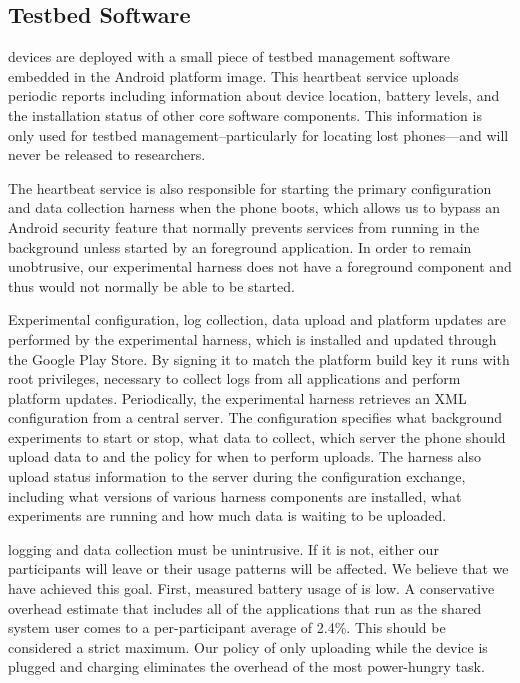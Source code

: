 \subsection{Testbed Software}

\PhoneLab{} devices are deployed with a small piece of testbed management
software embedded in the Android platform image. This heartbeat service
uploads periodic reports including information about device location, battery
levels, and the installation status of other core \PhoneLab{} software
components. This information is only used for testbed
management--particularly for locating lost phones---and will never be
released to researchers.

The heartbeat service is also responsible for starting the primary
\PhoneLab{} configuration and data collection harness when the phone boots,
which allows us to bypass an Android security feature that normally prevents
services from running in the background unless started by an foreground
application. In order to remain unobtrusive, our experimental harness does
not have a foreground component and thus would not normally be able to be
started.

Experimental configuration, log collection, data upload and platform updates
are performed by the \PhoneLab{} experimental harness, which is installed and
updated through the Google Play Store. By signing it to match the platform
build key it runs with root privileges, necessary to collect logs from all
applications and perform platform updates. Periodically, the experimental
harness retrieves an XML configuration from a central \PhoneLab{} server. The
configuration specifies what background experiments to start or stop, what
data to collect, which server the phone should upload data to and the policy
for when to perform uploads. The \PhoneLab{} harness also upload status
information to the server during the configuration exchange, including what
versions of various harness components are installed, what experiments are
running and how much data is waiting to be uploaded.


\PhoneLab{} logging and data collection must be unintrusive. If it is not,
either our participants will leave or their usage patterns will be affected.
We believe that we have achieved this goal. First, measured battery usage of
\PhoneLab{} is low. A conservative overhead estimate that includes all of the
applications that run as the shared system user comes to a per-participant
average of 2.4\%. This should be considered a strict maximum. Our policy of
only uploading while the device is plugged and charging eliminates the
overhead of the most power-hungry task.

